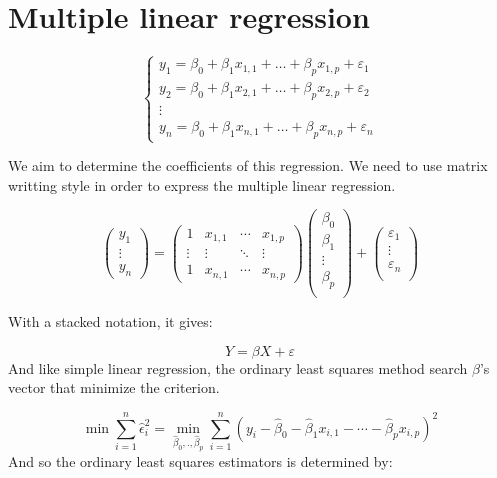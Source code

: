 \documentclass[
]{report}
\begin{document}
\hypertarget{multiple-linear-regression}{%
\section{Multiple linear regression}\label{multiple-linear-regression}}

\[{\displaystyle{\begin{cases}y_{1}=\beta_{0}+\beta_{1}x_{1,1}+\ldots +\beta_{p}x_{1,p}+\varepsilon_{1}\\y_{2}=\beta_{0}+\beta_{1}x_{2,1}+\ldots +\beta_{p}x_{2,p}+\varepsilon_{2}\\\vdots \\y_{n}=\beta_{0}+\beta_{1}x_{n,1}+\ldots +\beta_{p}x_{n,p}+\varepsilon _{n}\end{cases}}}\]

We aim to determine the coefficients of this regression. We need to use matrix writting style in order to express the multiple linear regression.

\[{\displaystyle {\begin{pmatrix}y_{1}\\\vdots \\y_{n}\end{pmatrix}}={\begin{pmatrix}1&x_{1,1}&\cdots &x_{1,p}\\\vdots &\vdots &\ddots &\vdots \\1 &x_{n,1}&\cdots &x_{n,p}\end{pmatrix}}{\begin{pmatrix}\beta_{0}\\\beta_{1}\\\vdots \\\beta_{p}\\\end{pmatrix}}+{\begin{pmatrix}\varepsilon_{1}\\\vdots \\\varepsilon _{n}\\\end{pmatrix}}}\]

With a stacked notation, it gives:

\[Y = \beta X + \varepsilon \]
And like simple linear regression, the ordinary least squares method search \(\beta\)'s vector that minimize the criterion.

\[{\displaystyle \min \sum_{i=1}^{n}{\hat{\epsilon }}_{i}^{2}=\min_{{\hat{\beta}}_{0},.,{\hat{\beta}}_{p}}\sum_{i=1}^{n}(y_{i}-{\hat{\beta}}_{0}-{\hat {\beta}}_{1}x_{i,1}-\cdots -{\hat{\beta}}_{p}x_{i,p})^{2}}\]
And so the ordinary least squares estimators is determined by:
\end{document}
